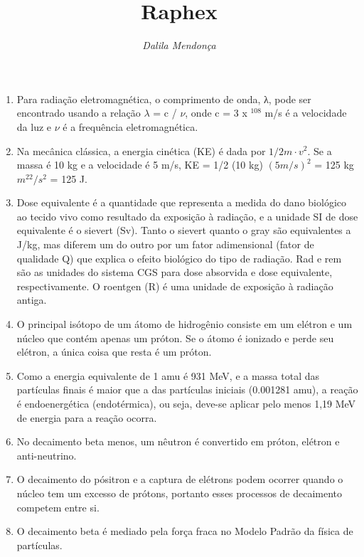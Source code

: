 \documentclass[11pt,a4paper]{article}
\title{\LobsterTwo\Huge{Raphex}}
\author{\LobsterTwo{2023}\nocite{*}}
\date{\LobsterTwo\textit{Dalila Mendonça}}
\begin{document}
	\maketitle

    \begin{enumerate}
        \item Para radiação eletromagnética, o comprimento de onda, λ, pode ser encontrado usando a relação $\lambda$ = c / $\nu$, onde c = 3 x $^108$ m/s é a velocidade da luz e $\nu$ é a frequência eletromagnética.
        
        \item Na mecânica clássica, a energia cinética (KE) é dada por $1/2m\cdot v^2$. Se a massa é 10 kg e a velocidade é 5 m/s, KE = 1/2 (10 kg) $(5 m/s)^2$ = 125 kg $m^22/s^2$ = 125 J.
        
        \item Dose equivalente é a quantidade que representa a medida do dano biológico ao tecido vivo como resultado da exposição à radiação, e a unidade SI de dose equivalente é o sievert (Sv). Tanto o sievert quanto o gray são equivalentes a J/kg, mas diferem um do outro por um fator adimensional (fator de qualidade Q) que explica o efeito biológico do tipo de radiação. Rad e rem são as unidades do sistema CGS para dose absorvida e dose equivalente, respectivamente. O roentgen (R) é uma unidade de exposição à radiação antiga.
        
        \item O principal isótopo de um átomo de hidrogênio consiste em um elétron e um núcleo que contém apenas um próton. Se o átomo é ionizado e perde seu elétron, a única coisa que resta é um próton.
        
        \item Como a energia equivalente de 1 amu é 931 MeV, e a massa total das partículas finais é maior que a das partículas iniciais (0.001281 amu), a reação é endoenergética (endotérmica), ou seja, deve-se aplicar pelo menos 1,19 MeV de energia para a reação ocorra.
        
        \item No decaimento beta menos, um nêutron é convertido em próton, elétron e anti-neutrino.
        
        \item O decaimento do pósitron e a captura de elétrons podem ocorrer quando o núcleo tem um excesso de prótons, portanto esses processos de decaimento competem entre si.
        
        \item O decaimento beta é mediado pela força fraca no Modelo Padrão da física de partículas.
        

\end{enumerate}
\end{document}
